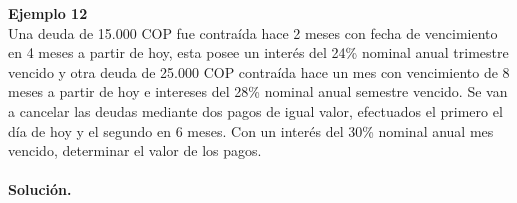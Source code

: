 \textbf{Ejemplo 12}\\
Una deuda de 15.000 COP fue contraída hace 2 meses con fecha de vencimiento en 4
meses a partir de hoy, esta posee un interés del 24\% nominal anual trimestre vencido y
otra deuda de 25.000 COP contraída hace un mes con vencimiento de 8 meses a partir de hoy
e intereses del 28\% nominal anual semestre vencido. Se van a cancelar las deudas
mediante dos pagos de igual valor, efectuados el primero el día de hoy y el segundo en 6
meses. Con un interés del 30\% nominal anual mes vencido,
determinar el valor de los pagos.\\ \\
\textbf{Solución.}\\
